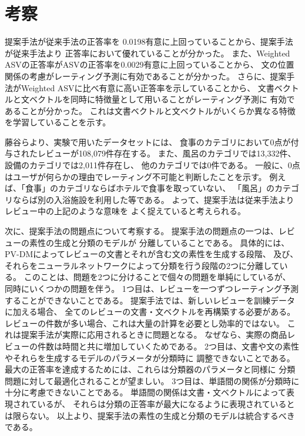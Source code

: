 \section{考察} \label{sec:Discussion}

提案手法が従来手法\cite{fujitani15}の正答率を
0.0198有意に上回っていることから、提案手法が従来手法\cite{fujitani15}より
正答率において優れていることが分かった。
また、Weighted ASVの正答率がASVの正答率を0.0029有意に上回っていることから、
文の位置関係の考慮がレーティング予測に有効であることが分かった。
さらに、提案手法がWeighted ASVに比べ有意に高い正答率を示していることから、
文書ベクトルと文ベクトルを同時に特徴量として用いることがレーティング予測に
有効であることが分かった。
これは文書ベクトルと文ベクトルがいくらか異なる特徴を学習していることを示す。

藤谷ら\cite{fujitani15}より、実験で用いたデータセットには、
食事のカテゴリにおいて0点が付与されたレビューが108,079件存在する。
また、風呂のカテゴリでは13,332件、設備のカテゴリでは2,011件存在し、
他のカテゴリでは0件である。
一般に、0点はユーザが何らかの理由でレーティング不可能と判断したことを示す。
例えば、「食事」のカテゴリならばホテルで食事を取っていない、
「風呂」のカテゴリならば別の入浴施設を利用した等である。
よって、提案手法は従来手法\cite{fujitani15}よりレビュー中の上記のような意味を
よく捉えていると考えられる。

次に、提案手法の問題点について考察する。
提案手法の問題点の一つは、レビューの素性の生成と分類のモデルが
分離していることである。
具体的には、PV-DMによってレビューの文書とそれが含む文の素性を生成する段階、
及び、それらをニューラルネットワークによって分類を行う段階の2つに分離している。
このことは、問題を2つに分けることで個々の問題を単純にしているが、
同時にいくつかの問題を伴う。
1つ目は、レビューを一つずつレーティング予測することができないことである。
提案手法では、新しいレビューを訓練データに加える場合、
全てのレビューの文書・文ベクトルを再構築する必要がある。
レビューの件数が多い場合、これは大量の計算を必要とし効率的ではない。
これは提案手法が実際に応用されるときに問題となる。
なぜなら、実際の商品レビューの件数は時間と共に増加していくためである。
2つ目は、文書や文の素性やそれらを生成するモデルのパラメータが分類時に
調整できないことである。
最大の正答率を達成するためには、これらは分類器のパラメータと同様に
分類問題に対して最適化されることが望ましい。
3つ目は、単語間の関係が分類時に十分に考慮できないことである。
単語間の関係は文書・文ベクトルによって表現されているが、
それらは分類の正答率が最大になるように表現されているとは限らない。
以上より、提案手法の素性の生成と分類のモデルは統合するべきである。
